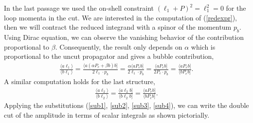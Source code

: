 In the last passage we used the on-shell constraint $(\ell_1+P)^2=\ell_1^2=0$ for the loop momenta in the cut. We are interested in the computation of (\ref{redexpr}), then we will contract the reduced integrand with a spinor of the momentum $p_b$. Using Dirac equation, we can observe the vanishing behavior of the contribution proportional to $\beta$. Consequently, the result only depends on $\alpha$ which is proportional to the uncut propagator and gives a bubble contribution,
\begin{align}
	\frac{\langle a\ell_1\rangle}{\langle b \ell_1 \rangle}=\frac{\langle a (\alpha P_e+\beta b) b]}{2\ell_1\cdot p_b}=\frac{\alpha \langle a P_e b]}{2\ell_1\cdot p_b}=\frac{\langle aP_e b]}{2P_e\cdot p_b}=\frac{\langle aP_eb]}{\langle b P_e b]}.	\label{sub3}
\end{align}
A similar computation holds for the last structure,
\begin{align}
	\frac{\langle a \ell_2 \rangle}{\langle b \ell_2 \rangle}=\frac{\langle a \ell_2 b]}{\langle b \ell_2 b]}=\frac{\langle a P_e b]}{\langle b P_e b]}.	\label{sub4}
\end{align}
Applying the substitutions (\ref{sub1}, \ref{sub2}, \ref{sub3}, \ref{sub4}), we can write the double cut of the amplitude in terms of scalar integrals as shown pictorially.
